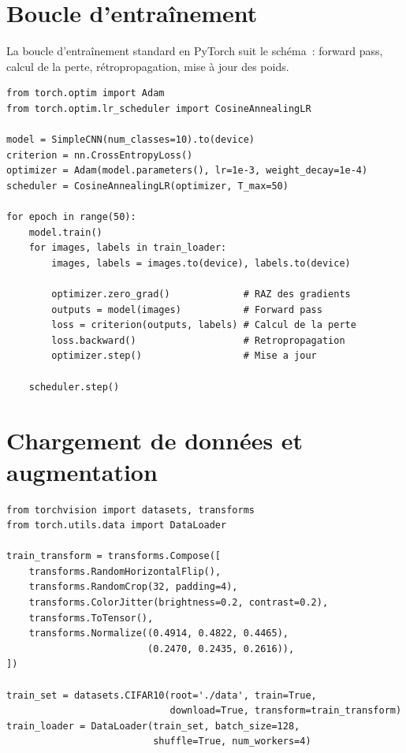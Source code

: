 \documentclass[a4paper,11pt,twoside]{book}
\begin{document}
\section{Boucle d'entraînement}

La boucle d'entraînement standard en PyTorch suit le schéma~: forward pass, calcul de la perte, rétropropagation, mise à jour des poids.

\begin{lstlisting}[caption={Boucle d'entraînement standard}]
from torch.optim import Adam
from torch.optim.lr_scheduler import CosineAnnealingLR

model = SimpleCNN(num_classes=10).to(device)
criterion = nn.CrossEntropyLoss()
optimizer = Adam(model.parameters(), lr=1e-3, weight_decay=1e-4)
scheduler = CosineAnnealingLR(optimizer, T_max=50)

for epoch in range(50):
    model.train()
    for images, labels in train_loader:
        images, labels = images.to(device), labels.to(device)

        optimizer.zero_grad()             # RAZ des gradients
        outputs = model(images)           # Forward pass
        loss = criterion(outputs, labels) # Calcul de la perte
        loss.backward()                   # Retropropagation
        optimizer.step()                  # Mise a jour

    scheduler.step()
\end{lstlisting}

\section{Chargement de données et augmentation}

\begin{lstlisting}[caption={Data loading avec augmentation}]
from torchvision import datasets, transforms
from torch.utils.data import DataLoader

train_transform = transforms.Compose([
    transforms.RandomHorizontalFlip(),
    transforms.RandomCrop(32, padding=4),
    transforms.ColorJitter(brightness=0.2, contrast=0.2),
    transforms.ToTensor(),
    transforms.Normalize((0.4914, 0.4822, 0.4465),
                         (0.2470, 0.2435, 0.2616)),
])

train_set = datasets.CIFAR10(root='./data', train=True,
                             download=True, transform=train_transform)
train_loader = DataLoader(train_set, batch_size=128,
                          shuffle=True, num_workers=4)
\end{lstlisting}
\end{document}
